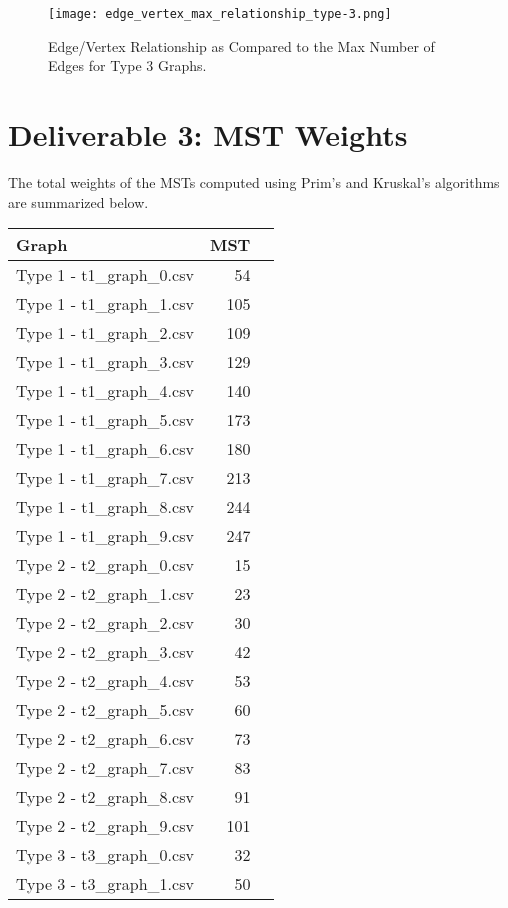 \documentclass{article}
\begin{document}
\begin{figure}[h!]
\centering
\texttt{[image: edge\_vertex\_max\_relationship\_type-3.png]}
\caption{Edge/Vertex Relationship as Compared to the Max Number of Edges for Type 3 Graphs.}
\end{figure}

\newpage
\section*{Deliverable 3: MST Weights}
The total weights of the MSTs computed using Prim's and Kruskal's algorithms are summarized below. 

\vspace{.5cm}
\begin{table}[h!]
\centering
\begin{tabular}{lrr}
\toprule
\textbf{Graph} & \textbf{MST} \\
\midrule
Type 1 - t1\_graph\_0.csv & 54 \\
Type 1 - t1\_graph\_1.csv & 105 \\
Type 1 - t1\_graph\_2.csv & 109 \\
Type 1 - t1\_graph\_3.csv & 129 \\
Type 1 - t1\_graph\_4.csv & 140 \\
Type 1 - t1\_graph\_5.csv & 173 \\
Type 1 - t1\_graph\_6.csv & 180 \\
Type 1 - t1\_graph\_7.csv & 213 \\
Type 1 - t1\_graph\_8.csv & 244 \\
Type 1 - t1\_graph\_9.csv & 247 \\
\hline
Type 2 - t2\_graph\_0.csv & 15 \\
Type 2 - t2\_graph\_1.csv & 23 \\
Type 2 - t2\_graph\_2.csv & 30 \\
Type 2 - t2\_graph\_3.csv & 42 \\
Type 2 - t2\_graph\_4.csv & 53 \\
Type 2 - t2\_graph\_5.csv & 60 \\
Type 2 - t2\_graph\_6.csv & 73 \\
Type 2 - t2\_graph\_7.csv & 83 \\
Type 2 - t2\_graph\_8.csv & 91 \\
Type 2 - t2\_graph\_9.csv & 101 \\
\hline
Type 3 - t3\_graph\_0.csv & 32 \\
Type 3 - t3\_graph\_1.csv & 50 \\

\end{tabular}
\end{table}
\end{document}
